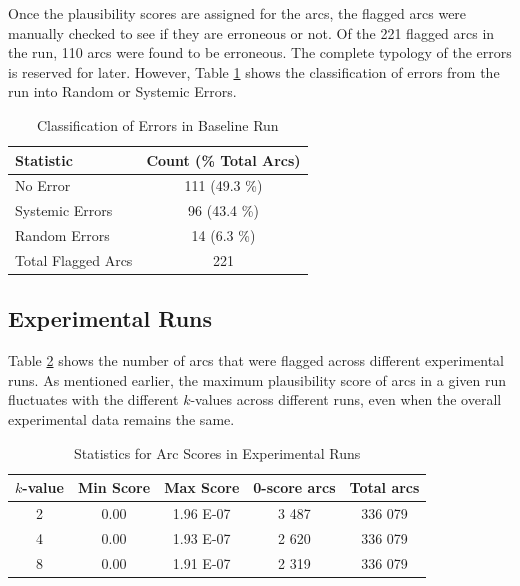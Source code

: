 Once the plausibility scores are assigned for the arcs, the flagged arcs were manually checked to see if they are erroneous or not. Of the 221 flagged arcs in the run, 110 arcs were found to be erroneous. The complete typology of the errors is reserved for later. However, Table \ref{tab:base_error_breakdown} shows the classification of errors from the run into Random or Systemic Errors.

\begin{table}[H]
    \centering
    \begin{tabular}{|l|c|}
        \hline
        \textbf{Statistic} & \textbf{Count (\% Total Arcs)}\\
        \hline
        No Error & 111 (49.3 \%)\\
        Systemic Errors & 96 (43.4 \%)\\
        Random Errors & 14 (6.3 \%)\\
        Total Flagged Arcs & 221\\
        \hline
    \end{tabular}
    \caption{Classification of Errors in Baseline Run}
    \label{tab:base_error_breakdown}
\end{table}


\subsection{Experimental Runs}
\label{statistics:experiments}

Table \ref{tab:absminmax} shows the number of arcs that were flagged across different experimental runs. As mentioned earlier, the maximum plausibility score of arcs in a given run fluctuates with the different $k$-values across different runs, even when the overall experimental data remains the same.

\begin{table}[H]
    \centering
    \begin{tabular}{|c|c|c|c|c|}
    \hline
    \textbf{$k$-value} & \textbf{Min Score} & \textbf{Max Score} & \textbf{0-score arcs} & \textbf{Total arcs}\\
    \hline
    \hline
    2 & 0.00 & 1.96 E-07 & 3 487 & 336 079 \\
    4 & 0.00 & 1.93 E-07 & 2 620 & 336 079 \\
    8 & 0.00 & 1.91 E-07 & 2 319 & 336 079 \\
    \hline
    \end{tabular}
    \caption{Statistics for Arc Scores in Experimental Runs}
    \label{tab:absminmax}
\end{table}

